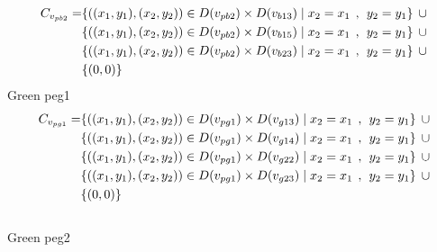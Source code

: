 \begin{align*}
C_{v_{pb2}} = &\{((x_{1},y_{1}),(x_{2},y_{2}))\in D(v_{pb2}) \times D(v_{b13})\mid x_{2} = x_{1} \hspace{1ex} , \hspace{1ex}  y_{2} = y_{1}\} \hspace{1ex} \cup \\& \{((x_{1},y_{1}),(x_{2},y_{2}))\in D(v_{pb2}) \times D(v_{b15})\mid x_{2} = x_{1} \hspace{1ex} , \hspace{1ex}  y_{2} = y_{1}\} \hspace{1ex} \cup \\& \{ ((x_{1},y_{1}),(x_{2},y_{2}))\in D(v_{pb2}) \times D(v_{b23})\mid x_{2} = x_{1} \hspace{1ex} , \hspace{1ex}  y_{2} = y_{1}\} \hspace{1ex} \cup \\& \{(0,0)\}
\end{align*}
 Green peg1 
\begin{align*}
C_{v_{pg1}} = &\{((x_{1},y_{1}),(x_{2},y_{2}))\in D(v_{pg1}) \times D(v_{g13})\mid x_{2} = x_{1} \hspace{1ex} , \hspace{1ex}  y_{2} = y_{1}\} \hspace{1ex} \cup 
\\& \{((x_{1},y_{1}),(x_{2},y_{2}))\in D(v_{pg1}) \times D(v_{g14})\mid x_{2} = x_{1} \hspace{1ex} , \hspace{1ex}  y_{2} = y_{1}\} \hspace{1ex} \cup 
\\&\{ ((x_{1},y_{1}),(x_{2},y_{2}))\in D(v_{pg1}) \times D(v_{g22})\mid x_{2} = x_{1} \hspace{1ex} , \hspace{1ex}  y_{2} = y_{1}\}\hspace{1ex} \cup 
\\&\{ ((x_{1},y_{1}),(x_{2},y_{2}))\in D(v_{pg1}) \times D(v_{g23})\mid x_{2} = x_{1} \hspace{1ex} , \hspace{1ex}  y_{2} = y_{1}\} \hspace{1ex} \cup 
\\&\{(0,0)\}
\end{align*}
\\ Green peg2 
